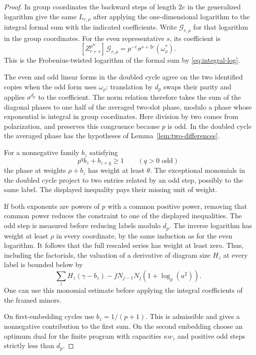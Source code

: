 \begin{proof}
In group coordinates the backward steps of length \(2e\)
in the generalized logarithm give the same \(L_{r,\rho}\)
after applying the one-dimensional logarithm to the
integral formal sum with the indicated coefficients.
Write \(\mathcal G_{r,\rho}\) for that logarithm in the group coordinates. For the even representative \(s\), its coefficient is
\[
  [Z_{r+s}^{p^{2e}}]\,\mathcal G_{r,\rho}=p^{-e}\sigma^{s+2e}(\omega_\rho^*).
\]
 This is the Frobenius-twisted
logarithm of the formal sum by \eqref{eq:integral-log}.

The even and odd
linear forms in the doubled cycle agree on the two
identified copies when the odd form uses \(\omega_\rho\):
translation by \(d_p\) swaps their parity and applies
\(\sigma^{d_p}\) to the coefficient. The norm relation
therefore takes the sum of the diagonal phases to one
half of the averaged two-slot phase, modulo a phase
whose exponential is integral in group coordinates.
Here division by two comes from polarization, and
preserves this congruence because \(p\) is odd. In the
doubled cycle the averaged phase has the hypotheses of
Lemma~\ref{lem:two-differences}.


For a nonnegative family \(b_z\) satisfying
\[
              p^q b_z+b_{z+q}\ge1\qquad(q>0\text{ odd})
\]
the phase at weights \(\rho+b_z\) has weight at least
\(\theta\). The exceptional monomials in the doubled
cycle project to two entries related by an odd step,
possibly to the same label. The displayed inequality pays
their missing unit of weight.

If both exponents are powers
of \(p\) with a common positive power, removing that
common power reduces the constraint to one of the displayed
inequalities. The odd step is measured before reducing labels
modulo \(d_p\). The inverse logarithm has weight at least
\(\rho\) in every coordinate, by the same induction as for
the even logarithm. It follows that the full rescaled
series has weight at least zero. Thus, including the
factorials, the valuation of a derivative of diagram size
\(H_z\) at every label is bounded below by
\[
          \sum_z H_z(\gamma-b_z)-
                    f N_{j-1}N_j(1+\log_p(a^2)).
\]
One can use this monomial estimate before applying the
integral coefficients of the framed minors.


On first-embedding cycles use \(b_z=1/(p+1)\). This is
admissible and gives a nonnegative contribution to the first
sum. On the second embedding choose an optimum dual for
the finite program with capacities \(\kappa w_z\) and
positive odd steps strictly less than \(d_p\).


\end{proof}
